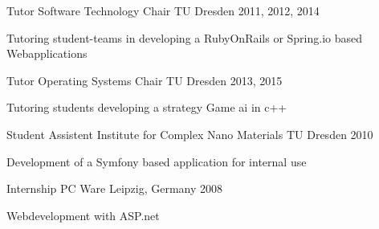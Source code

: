 \begin{cventries}

  \cventry
    {Tutor}
    {Software Technology Chair}
    {TU Dresden}
    {2011, 2012, 2014}
    {
      \begin{cvitems}
      \item[] {Tutoring student-teams in developing a RubyOnRails or Spring.io based Webapplications}
      \end{cvitems}
    }

  \cventry
    {Tutor}
    {Operating Systems Chair}
    {TU Dresden}
    {2013, 2015}
    {
      \begin{cvitems}
      \item[] {Tutoring students developing a strategy Game ai in c++}
      \end{cvitems}
    }

  \cventry
    {Student Assistent}
    {Institute for Complex Nano Materials}
    {TU Dresden}
    {2010}
    {
      \begin{cvitems}
      \item[] {Development of a Symfony based application for internal use}
      \end{cvitems}
    }

  \cventry
    {Internship}
    {PC Ware}
    {Leipzig, Germany}
    {2008}
    {
      \begin{cvitems}
      \item {Webdevelopment with ASP.net}
      \end{cvitems}
    }

\end{cventries}
